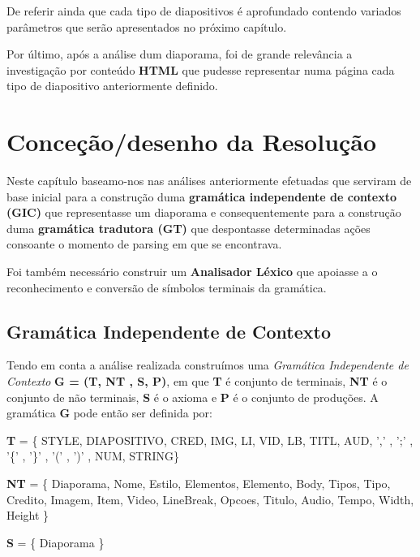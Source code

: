 \documentclass[11pt,a4paper]{report}
\begin{document}
De referir ainda que cada tipo de diapositivos é aprofundado contendo variados parâmetros que serão apresentados no próximo capítulo.

Por último, após a análise dum diaporama, foi de grande relevância a investigação por conteúdo \textbf{HTML} que pudesse representar numa página cada tipo de diapositivo anteriormente definido.

\chapter{Conceção/desenho da Resolução}
\label{chap:concecao}

Neste capítulo baseamo-nos nas análises anteriormente efetuadas que serviram de base inicial para a construção duma \textbf{gramática independente de contexto (GIC)} que representasse um diaporama e consequentemente para a construção duma \textbf{gramática tradutora (GT)} que despontasse determinadas ações consoante o momento de parsing em que se encontrava.

Foi também necessário construir um \textbf{Analisador Léxico} que apoiasse a o reconhecimento e conversão de símbolos terminais da gramática.


\section{Gramática Independente de Contexto}

Tendo em conta a análise realizada construímos uma \textit{Gramática Independente de Contexto} \textbf{G = (T, NT , S, P)}, em que \textbf{T} é conjunto de terminais, \textbf{NT} é o conjunto de não terminais, \textbf{S} é o axioma e \textbf{P} é o conjunto de produções. A gramática \textbf{G} pode então ser definida por:

\vspace{0.5cm}

\textbf{T} = \{ STYLE, DIAPOSITIVO, CRED, IMG, LI, VID, LB, TITL, AUD, ',' , ';' , '\{' , '\}' , '(' , ')' , NUM, STRING\}

\vspace{0.5cm}

\textbf{NT} = \{ Diaporama, Nome, Estilo, Elementos, Elemento, Body, Tipos, Tipo, Credito, Imagem, Item, Video, LineBreak, Opcoes, Titulo, Audio, Tempo, Width, Height \}

\vspace{0.5cm}

\textbf{S} = \{ Diaporama \}
\end{document}
